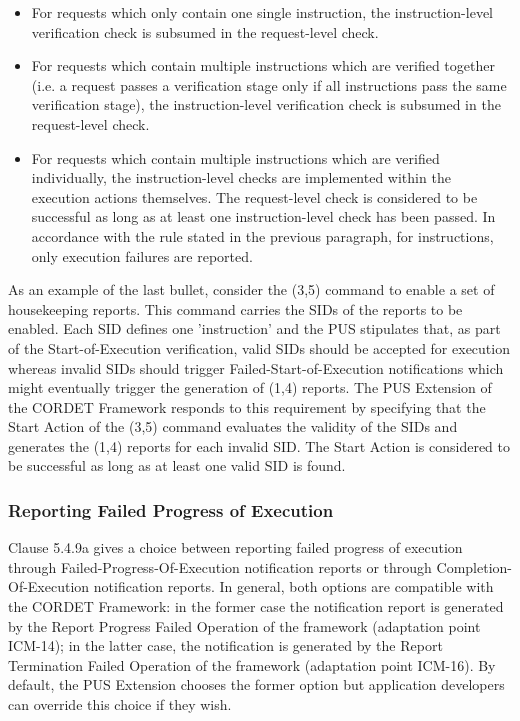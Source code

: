\documentclass{pnp_article}
\begin{document}
\begin{itemize}
\item For requests which only contain one single instruction, the instruction-level verification check is subsumed in the request-level check.
\item For requests which contain multiple instructions which are verified together (i.e. a request passes a verification stage only if all instructions pass the same verification stage), the instruction-level verification check is subsumed in the request-level check.
\item For requests which contain multiple instructions which are verified individually, the instruction-level checks are implemented within the execution actions themselves. The request-level check is considered to be successful as long as at least one instruction-level check has been passed. In accordance with the rule stated in the previous paragraph, for instructions, only execution failures are reported.
\end{itemize}

As an example of the last bullet, consider the (3,5) command to enable a set of housekeeping reports. This command carries the SIDs of the reports to be enabled. Each SID defines one 'instruction' and the PUS stipulates that, as part of the Start-of-Execution verification, valid SIDs should be accepted for execution whereas invalid SIDs should trigger Failed-Start-of-Execution notifications which might eventually trigger the generation of (1,4) reports. The PUS Extension of the CORDET Framework responds to this requirement by specifying that the Start Action of the (3,5) command evaluates the validity of the SIDs and generates the (1,4) reports for each invalid SID. The Start Action is considered to be successful as long as at least one valid SID is found. 

\subsubsection{Reporting Failed Progress of Execution}
Clause 5.4.9a gives a choice between reporting failed progress of execution through Failed-Progress-Of-Execution notification reports or through Completion-Of-Execution notification reports. In general, both options are compatible with the CORDET Framework: in the former case the notification report is generated by the Report Progress Failed Operation of the framework (adaptation point ICM-14); in the latter case, the notification is generated by the Report Termination Failed Operation of the framework (adaptation point ICM-16). By default, the PUS Extension chooses the former option but application developers can override this choice if they wish.
\end{document}
